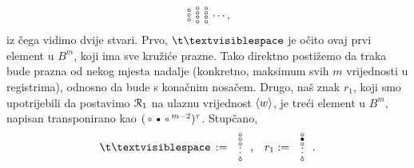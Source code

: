 \begin{equation}
\begin{array}{@{}c@{}}
    \text\textopenbullet\\
    \text\textopenbullet\\
    \text\textopenbullet
    \end{array}
    \begin{array}{@{}c@{}}
    \text\textopenbullet\\
    \text\textopenbullet\\
    \text\textopenbullet\\
    \text\textopenbullet
    \end{array}
    \begin{array}{@{}c@{}}
    \text\textopenbullet\\
    \text\textopenbullet\\
    \text\textopenbullet\\
    \text\textopenbullet
    \end{array}\dotsm\text,
\end{equation}
iz čega vidimo dvije stvari. Prvo, $\bl$ je očito ovaj prvi element u $B^m$, koji ima sve kružiće prazne. Tako direktno postižemo da traka bude prazna od nekog mjesta nadalje (konkretno, maksimum svih $m$ vrijednosti u registrima), odnosno da bude s konačnim nosačem. Drugo, naš znak $r_1$, koji smo upotrijebili da postavimo $\mathcal R_{1}$ na ulaznu vrijednost $\langle w\rangle$, je treći element u $B^m$, napisan transponirano kao $(\text{\textopenbullet\textbullet\textopenbullet}^{m-2})^\tau$. Stupčano,
\begin{equation}
\renewcommand{\arraystretch}{0.1}
    \bl\,:=\begin{array}{c}
    \text\textopenbullet\\
    \text\textopenbullet\\
    \text\textopenbullet\\
    \MTFlushSpaceAbove
    \vdotswithin{\text\textopenbullet}\\
    \text\textopenbullet
    \end{array}\text{,\quad}
    r_1:=\begin{array}{c}
    \text\textopenbullet\\
    \text\textbullet\\
    \text\textopenbullet\\
    \MTFlushSpaceAbove
    \vdotswithin{\text\textopenbullet}\\
    \text\textopenbullet
    \end{array}\text.
\end{equation}

